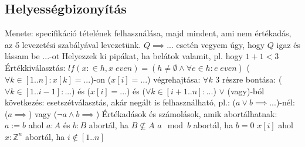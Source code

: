 \documentclass[12pt,a4paper]{article}
\begin{document}
\pagebreak

\subsection{Helyességbizonyítás}

\begin{outline}
	\1 Menete: specifikáció tételének felhasználása, majd mindent, ami nem értékadás, az ő levezetési szabályával levezetünk.
	\1 $Q \implies ...$ esetén vegyem úgy, hogy $Q$ igaz és lássam be $...$-ot
	\1 Helyezzek ki pipákat, ha belátok valamit, pl. hogy $1+1 < 3$
	\1 Értékkiválasztás: $lf(x:\in h, x \; even) = (h \ne \emptyset \wedge \forall e \in h : e \; even)$
	\1 ($\forall k \in [1..n]: x[k]=...$)-on ($x[i]=...$) végrehajtása: $\forall k$ 3 részre bontása: ($\forall k \in [1..i-1]: ...$) és ($x[i]=...$) és ($\forall k \in [i+1..n]: ...$)
	\1 $\lor$ (vagy)-ból következés: esetszétválasztás, akár negált is felhasználható, pl.: ($a \lor b \implies ...$)-nél: ($a \implies$) vagy ($\lnot a \wedge b \implies$)
	\1 Értékadások és számolások, amik abortálhatnak:
		\2 $a := b$ ahol $a : A$ és $b : B$ abortál, ha $B \not \subseteq A$
		\2 $a \mod b$ abortál, ha $b=0$
		\2 $x[i]$ ahol $x:\mathbb{Z}^n$ abortál, ha $i \notin [1..n]$	
\end{outline}
\end{document}
